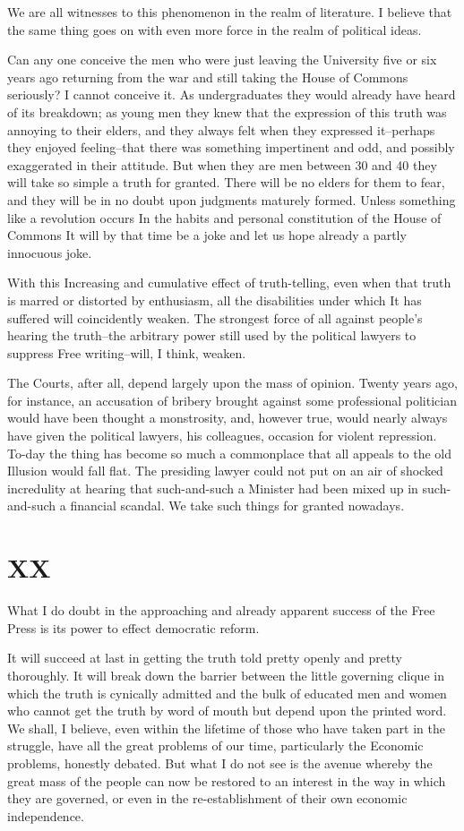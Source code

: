 \documentclass{book}
\begin{document}
We are all witnesses to this phenomenon in the realm of literature. I believe that the same thing goes on with even more force in the realm of political ideas.

Can any one conceive the men who were just leaving the University five or six years ago returning from the war and still taking the House of Commons seriously? I cannot conceive it. As undergraduates they would already have heard of its breakdown; as young men they knew that the expression of this truth was annoying to their elders, and they always felt when they expressed it–perhaps they enjoyed feeling–that there was something impertinent and odd, and possibly exaggerated in their attitude. But when they are men between 30 and 40 they will take so simple a truth for granted. There will be no elders for them to fear, and they will be in no doubt upon judgments maturely formed. Unless something like a revolution occurs In the habits and personal constitution of the House of Commons It will by that time be a joke and let us hope already a partly innocuous joke.

With this Increasing and cumulative effect of truth-telling, even when that truth is marred or distorted by enthusiasm, all the disabilities under which It has suffered will coincidently weaken. The strongest force of all against people’s hearing the truth–the arbitrary power still used by the political lawyers to suppress Free writing–will, I think, weaken.

The Courts, after all, depend largely upon the mass of opinion. Twenty years ago, for instance, an accusation of bribery brought against some professional politician would have been thought a monstrosity, and, however true, would nearly always have given the political lawyers, his colleagues, occasion for violent repression. To-day the thing has become so much a commonplace that all appeals to the old Illusion would fall flat. The presiding lawyer could not put on an air of shocked incredulity at hearing that such-and-such a Minister had been mixed up in such-and-such a financial scandal. We take such things for granted nowadays.

\chapter*{XX}
\label{chapter-21}
What I do doubt in the approaching and already apparent success of the Free Press is its power to effect democratic reform.

It will succeed at last in getting the truth told pretty openly and pretty thoroughly. It will break down the barrier between the little governing clique in which the truth is cynically admitted and the bulk of educated men and women who cannot get the truth by word of mouth but depend upon the printed word. We shall, I believe, even within the lifetime of those who have taken part in the struggle, have all the great problems of our time, particularly the Economic problems, honestly debated. But what I do not see is the avenue whereby the great mass of the people can now be restored to an interest in the way in which they are governed, or even in the re-establishment of their own economic independence.
\end{document}
